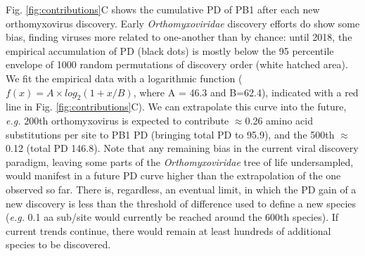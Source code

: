 \documentclass[11pt,twocolumn]{article}
\begin{document}
Fig. \ref{fig:contributions}C shows the cumulative PD of PB1 after each new orthomyxovirus discovery. Early \textit{Orthomyxoviridae} discovery efforts do show some bias, finding viruses more related to one-another than by chance: until 2018, the empirical accumulation of PD (black dots) is mostly below the 95 percentile envelope of 1000 random permutations of discovery order (white hatched area). We fit the empirical data with a logarithmic function ($f(x) = A \times log_{2} (1 + x/B)$, where A = 46.3 and B=62.4), indicated with a red line in Fig. \ref{fig:contributions}C). We can extrapolate this curve into the future, \textit{e.g.} 200th orthomyxovirus is expected to contribute $\approx$0.26 amino acid substitutions per site to PB1 PD (bringing total PD to 95.9), and the 500th $\approx$0.12 (total PD 146.8). Note that any remaining bias in the current viral discovery paradigm, leaving some parts of the \textit{Orthomyxoviridae} tree of life undersampled, would manifest in a future PD curve higher than the extrapolation of the one observed so far. There is, regardless, an eventual limit, in which the PD gain of a new discovery is less than the threshold of difference used to define a new species (\textit{e.g.} 0.1 aa sub/site would currently be reached around the 600th species). If current trends continue, there would remain at least hundreds of additional species to be discovered.
\end{document}
